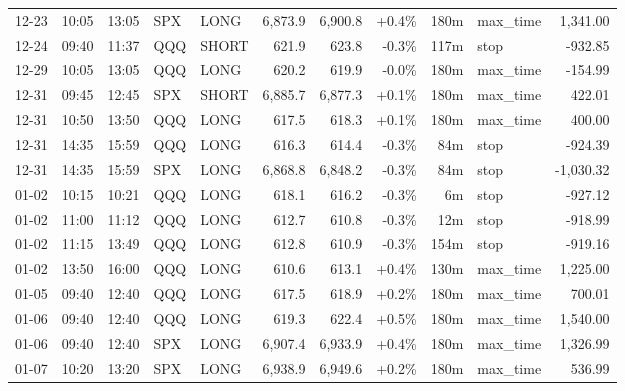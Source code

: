\documentclass[11pt,a4paper,twoside]{article}
\begin{document}
\begin{center}
\begin{longtable}{>{\color{txtmain}}l l l l l r r r r >{\color{txtmain}}l r}
12-23 & 10:05 & 13:05 & SPX & LONG & 6,873.9 & 6,900.8 & \textcolor{wingreen}{+0.4\%} & 180m & max\_time & \textcolor{wingreen}{1,341.00} \\
12-24 & 09:40 & 11:37 & QQQ & SHORT & 621.9 & 623.8 & \textcolor{lossred}{-0.3\%} & 117m & stop & \textcolor{lossred}{-932.85} \\
12-29 & 10:05 & 13:05 & QQQ & LONG & 620.2 & 619.9 & \textcolor{lossred}{-0.0\%} & 180m & max\_time & \textcolor{lossred}{-154.99} \\
12-31 & 09:45 & 12:45 & SPX & SHORT & 6,885.7 & 6,877.3 & \textcolor{wingreen}{+0.1\%} & 180m & max\_time & \textcolor{wingreen}{422.01} \\
12-31 & 10:50 & 13:50 & QQQ & LONG & 617.5 & 618.3 & \textcolor{wingreen}{+0.1\%} & 180m & max\_time & \textcolor{wingreen}{400.00} \\
12-31 & 14:35 & 15:59 & QQQ & LONG & 616.3 & 614.4 & \textcolor{lossred}{-0.3\%} & 84m & stop & \textcolor{lossred}{-924.39} \\
12-31 & 14:35 & 15:59 & SPX & LONG & 6,868.8 & 6,848.2 & \textcolor{lossred}{-0.3\%} & 84m & stop & \textcolor{lossred}{-1,030.32} \\
01-02 & 10:15 & 10:21 & QQQ & LONG & 618.1 & 616.2 & \textcolor{lossred}{-0.3\%} & 6m & stop & \textcolor{lossred}{-927.12} \\
01-02 & 11:00 & 11:12 & QQQ & LONG & 612.7 & 610.8 & \textcolor{lossred}{-0.3\%} & 12m & stop & \textcolor{lossred}{-918.99} \\
01-02 & 11:15 & 13:49 & QQQ & LONG & 612.8 & 610.9 & \textcolor{lossred}{-0.3\%} & 154m & stop & \textcolor{lossred}{-919.16} \\
01-02 & 13:50 & 16:00 & QQQ & LONG & 610.6 & 613.1 & \textcolor{wingreen}{+0.4\%} & 130m & max\_time & \textcolor{wingreen}{1,225.00} \\
01-05 & 09:40 & 12:40 & QQQ & LONG & 617.5 & 618.9 & \textcolor{wingreen}{+0.2\%} & 180m & max\_time & \textcolor{wingreen}{700.01} \\
01-06 & 09:40 & 12:40 & QQQ & LONG & 619.3 & 622.4 & \textcolor{wingreen}{+0.5\%} & 180m & max\_time & \textcolor{wingreen}{1,540.00} \\
01-06 & 09:40 & 12:40 & SPX & LONG & 6,907.4 & 6,933.9 & \textcolor{wingreen}{+0.4\%} & 180m & max\_time & \textcolor{wingreen}{1,326.99} \\
01-07 & 10:20 & 13:20 & SPX & LONG & 6,938.9 & 6,949.6 & \textcolor{wingreen}{+0.2\%} & 180m & max\_time & \textcolor{wingreen}{536.99} \\

\end{longtable}
\end{center}
\end{document}
